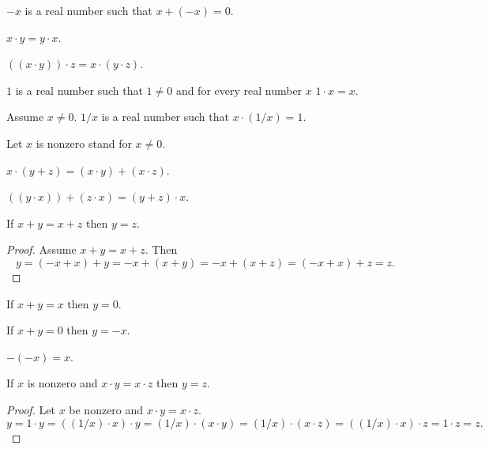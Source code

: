 \documentclass{article}
\begin{document}
\begin{forthel}
\begin{signature}[1 12 A5]
$-x$ is a real number such that $x + (-x) = 0$.
\end{signature}

\begin{axiom}[1 12 M2]
$x \cdot y = y \cdot x$.
\end{axiom}

\begin{axiom}[1 12 M3]
$((x \cdot y)) \cdot z = x \cdot (y \cdot z)$.
\end{axiom}

\begin{signature}[1 12 M4]
$1$ is a real number such that $1 \neq 0$ and
for every real number $x$ $1 \cdot x = x$.
\end{signature}

\begin{signature}[1 12 M5]
Assume $x \neq 0$. $1/x$ is a real number
such that $x \cdot (1/x) = 1$.
\end{signature}

Let $x$ is nonzero stand for $x \neq 0$.

\begin{axiom}[1 12 D]
$x \cdot (y + z) = (x \cdot y) + (x \cdot z)$.
\end{axiom}

\begin{proposition}[Dist1]
$((y \cdot x)) + (z \cdot x) = (y + z) \cdot x$.
\end{proposition}

\begin{proposition}[1 14 a]
If $x + y = x + z$ then $y = z$.
\end{proposition}
\begin{proof}
Assume $x + y = x + z$.
Then \[ y = (-x+x) + y = -x + (x+y) = -x + (x+z) = (-x+x) + z = z. \]
\end{proof}

\begin{proposition}[1 14 b]
If $x + y = x$ then $y = 0$.
\end{proposition}

\begin{proposition}[1 14 c]
If $x + y = 0$ then $y = -x$.
\end{proposition}

\begin{proposition}[1 14 d]
$-(-x) = x$.
\end{proposition}


\begin{proposition}[1 15 a]
If $x$ is nonzero and $x \cdot y = x \cdot z$
then $y = z$.
\end{proposition}
\begin{proof}
Let $x$ be nonzero and $x \cdot y = x \cdot z$.
\[ y = 1 \cdot y = ((1/x) \cdot x) \cdot y = (1/x) \cdot (x \cdot y) =
(1/x) \cdot (x \cdot z) = ((1/x) \cdot x) \cdot z = 1 \cdot z = z. \]
\end{proof}


\end{forthel}
\end{document}
